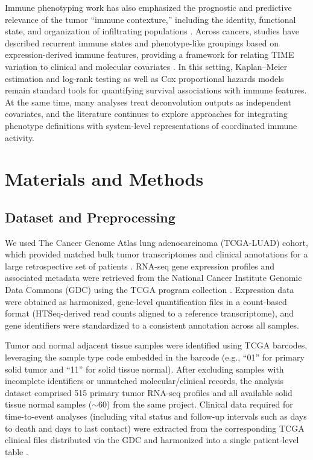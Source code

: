 \documentclass[conference]{IEEEtran}
\begin{document}
Immune phenotyping work has also emphasized the prognostic and predictive relevance of the tumor ``immune contexture,'' including the identity, functional state, and organization of infiltrating populations \cite{Fridman2017}.
Across cancers, studies have described recurrent immune states and phenotype-like groupings based on expression-derived immune features, providing a framework for relating TIME variation to clinical and molecular covariates \cite{Thorsson2018,Rooney2015,ChenMellman2017}.
In this setting, Kaplan--Meier estimation and log-rank testing \cite{KaplanMeier1958} as well as Cox proportional hazards models \cite{Cox1972} remain standard tools for quantifying survival associations with immune features.
At the same time, many analyses treat deconvolution outputs as independent covariates, and the literature continues to explore approaches for integrating phenotype definitions with system-level representations of coordinated immune activity.

\section{Materials and Methods}
\subsection{Dataset and Preprocessing}
We used The Cancer Genome Atlas lung adenocarcinoma (TCGA-LUAD) cohort, which provided matched bulk tumor transcriptomes and clinical annotations for a large retrospective set of patients \cite{TCGA_LUAD_2014}.
RNA-seq gene expression profiles and associated metadata were retrieved from the National Cancer Institute Genomic Data Commons (GDC) using the TCGA program collection \cite{Grossman2016GDC}.
Expression data were obtained as harmonized, gene-level quantification files in a count-based format (HTSeq-derived read counts aligned to a reference transcriptome), and gene identifiers were standardized to a consistent annotation across all samples.

Tumor and normal adjacent tissue samples were identified using TCGA barcodes, leveraging the sample type code embedded in the barcode (e.g., ``01'' for primary solid tumor and ``11'' for solid tissue normal).
After excluding samples with incomplete identifiers or unmatched molecular/clinical records, the analysis dataset comprised 515 primary tumor RNA-seq profiles and all available solid tissue normal samples ($\sim$60) from the same project.
Clinical data required for time-to-event analyses (including vital status and follow-up intervals such as days to death and days to last contact) were extracted from the corresponding TCGA clinical files distributed via the GDC and harmonized into a single patient-level table \cite{Grossman2016GDC,Liu2018Clinical}.
\end{document}
